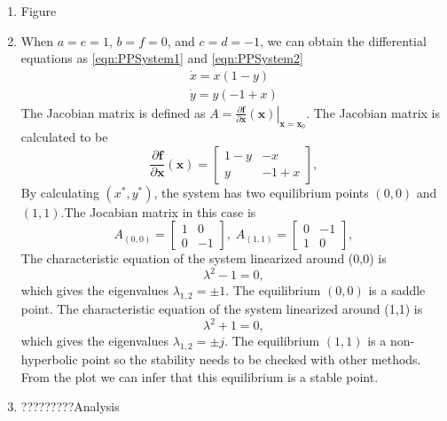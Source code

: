 \begin{enumerate}

\item Figure
\item When 
$a=e=1$, $b=f=0$, and $c=d=-1$,
  we can obtain the differential equations as \eqref{eqn:PPSystem1} and \eqref{eqn:PPSystem2} 
\begin{subequations}\label{eqn:PPSystem}
\begin{align}
    \dot{x} = x(1-y) \label{eqn:PPSystem1} \\
    \dot{y} = y(-1+x) \label{eqn:PPSystem2}
\end{align}
\end{subequations}
The Jacobian matrix is defined as $A = \left. \frac{\partial\textbf{f}}{\partial \textbf{x}}(\textbf{x}) \right|_{\textbf{x}=\textbf{x}_0}$. The Jacobian matrix is calculated to be
\begin{equation*}
    \frac{\partial\textbf{f}}{\partial \textbf{x}}(\textbf{x}) =
    \left[\begin{array}{cc}
    1-y & -x \\
    y & -1+x
    \end{array}\right],
\end{equation*}
By calculating $(x^*,y^*)$, the system has two equilibrium points $(0,0)$ and $(1,1)$.The Jocabian matrix in this case is
\begin{equation*}
    A_{(0,0)} =
    \left[\begin{array}{cc}
    1 & 0 \\
    0 & -1
    \end{array}\right], \; A_{(1,1)} =
    \left[\begin{array}{cc}
    0 & -1 \\
    1 & 0
    \end{array}\right],   
    \end{equation*}
The characteristic equation of the system linearized around \mbox{(0,0)} is
$$\lambda^2 -1 = 0,$$ which gives the eigenvalues $\lambda_{1,2} = \pm 1$. The equilibrium $(0,0)$ is a saddle point. 
The characteristic equation of the system linearized around \mbox{(1,1)} is
$$\lambda^2 +1 = 0,$$ which gives the eigenvalues $\lambda_{1,2} = \pm j$. The equilibrium $(1,1)$ is a non-hyperbolic point so the stability needs to be checked with other methods. From the plot we can infer that this equilibrium is a stable point. 
\item ?????????Analysis
 
\end{enumerate}